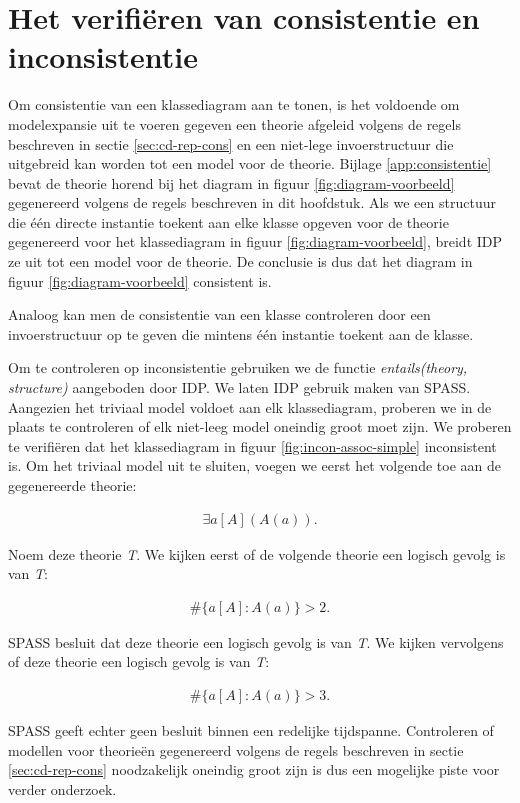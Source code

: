 \section{Het verifi\"eren van consistentie en inconsistentie}

Om consistentie van een klassediagram aan te tonen, is het voldoende om modelexpansie uit te voeren gegeven een theorie afgeleid volgens de regels beschreven in sectie \ref{sec:cd-rep-cons} en een niet-lege invoerstructuur die uitgebreid kan worden tot een model voor de theorie. Bijlage \ref{app:consistentie} bevat de theorie horend bij het diagram in figuur \ref{fig:diagram-voorbeeld} gegenereerd volgens de regels beschreven in dit hoofdstuk. Als we een structuur die \'e\'en directe instantie toekent aan elke klasse opgeven voor de theorie gegenereerd voor het klassediagram in figuur \ref{fig:diagram-voorbeeld}, breidt IDP ze uit tot een model voor de theorie. De conclusie is dus dat het diagram in figuur \ref{fig:diagram-voorbeeld} consistent is.

Analoog kan men de consistentie van een klasse controleren door een invoerstructuur op te geven die mintens \'e\'en instantie toekent aan de klasse.

Om te controleren op inconsistentie gebruiken we de functie \textit{entails(theory, structure)} aangeboden door IDP\cite{DeCatBroes2014PLaa}. We laten IDP gebruik maken van SPASS\cite{SPASS}. Aangezien het triviaal model voldoet aan elk klassediagram, proberen we in de plaats te controleren of elk niet-leeg model oneindig groot moet zijn. We proberen te verifi\"eren dat het klassediagram in figuur \ref{fig:incon-assoc-simple} inconsistent is. Om het triviaal model uit te sluiten, voegen we eerst het volgende toe aan de gegenereerde theorie:

\begin{align*}
	\exists{a}[A](A(a)).
\end{align*}

Noem deze theorie \textit{T}. We kijken eerst of de volgende theorie een logisch gevolg is van \textit{T}:

\begin{align*}
	\#\{a [A] : A(a)\} > 2.
\end{align*}

SPASS besluit dat deze theorie een logisch gevolg is van \textit{T}. We kijken vervolgens of deze theorie een logisch gevolg is van \textit{T}:

\begin{align*}
\#\{a [A] : A(a)\} > 3.
\end{align*}

SPASS geeft echter geen besluit binnen een redelijke tijdspanne. Controleren of modellen voor theorie\"en gegenereerd volgens de regels beschreven in sectie \ref{sec:cd-rep-cons} noodzakelijk oneindig groot zijn is dus een mogelijke piste voor verder onderzoek.